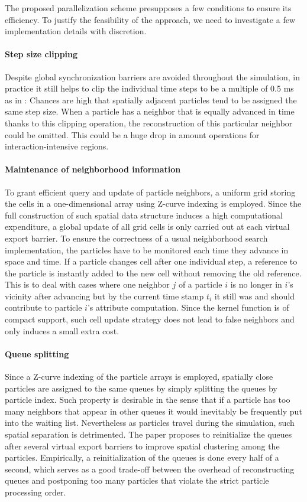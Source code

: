 \documentclass[
	11pt, 
	DIV10,
	ngerman,
	a4paper, 
	oneside, 
	headings=normal, 
	captions=tableheading,
	final, 
	numbers=noenddot
]{scrartcl}
\begin{document}
The proposed parallelization scheme presupposes a few conditions to ensure its efficiency. To justify the feasibility of the approach, we need to investigate a few implementation details with discretion.

\paragraph{Step size clipping}
Despite global synchronization barriers are avoided throughout the simulation, in practice it still helps to clip the individual time steps to be a multiple of 0.5 ms as in \cite{goswami2014regional}: Chances are high that spatially adjacent particles tend to be assigned the same step size. When a particle has a neighbor that is equally advanced in time thanks to this clipping operation, the reconstruction of this particular neighbor could be omitted. This could be a huge drop in amount operations for interaction-intensive regions.

\paragraph{Maintenance of neighborhood information}
To grant efficient query and update of particle neighbors, a uniform grid storing the cells in a one-dimensional array using Z-curve indexing is employed. Since the full construction of such spatial data structure induces a high computational expenditure, a global update of all grid cells is only carried out at each virtual export barrier. To ensure the correctness of a usual neighborhood search implementation, the particles have to be monitored each time they advance in space and time. If a particle changes cell after one individual step, a reference to the particle is instantly added to the new cell without removing the old reference. This is to deal with cases where one neighbor $j$ of a particle $i$ is no longer in $i$'s vicinity after advancing but by the current time stamp $t_{i}$ it still was and should contribute to particle $i$'s attribute computation. Since the kernel function is of compact support, such cell update strategy does not lead to false neighbors and only induces a small extra cost.

\paragraph{Queue splitting}
Since a Z-curve indexing of the particle arrays is employed, spatially close particles are assigned to the same queues by simply splitting the queues by particle index. Such property is desirable in the sense that if a particle has too many neighbors that appear in other queues it would inevitably be frequently put into the waiting list. Nevertheless as particles travel during the simulation, such spatial separation is detrimented. The paper proposes to reinitialize the queues after several virtual export barriers to improve spatial clustering among the particles. Empirically, a reinitialization of the queues is done every half of a second, which serves as a good trade-off between the overhead of reconstructing queues and postponing too many particles that violate the strict particle processing order.
\end{document}
